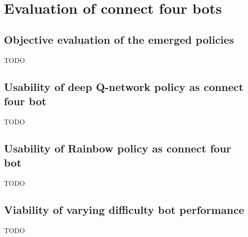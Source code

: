 \chapter{Evaluation of connect four bots}
\label{ch:connect_four_eval}


\section{Objective evaluation of the emerged policies}
\label{sec:connect_four_eval-metrics}

TODO


\section{Usability of deep Q-network policy as connect four bot}
\label{sec:connect_four_eval-dqn_vs_human}

TODO


\section{Usability of Rainbow policy as connect four bot}
\label{sec:connect_four_eval-rainbow_vs_human}

TODO


\section{Viability of varying difficulty bot performance}
\label{sec:connect_four_eval-varying_difficulty}

TODO